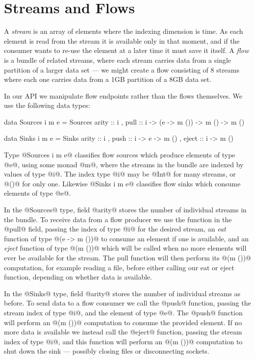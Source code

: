 
\section{Streams and Flows}

A \emph{stream} is an array of elements where the indexing dimension is time. As each element is read from the stream it is available only in that moment, and if the consumer wants to re-use the element at a later time it must save it itself. A \emph{flow} is a bundle of related streams, where each stream carries data from a single partition of a larger data set --- we might create a flow consisting of 8 streams where each one carries data from a 1GB partition of a 8GB data set.

\eject
In our API we manipulate flow endpoints rather than the flows themselves. We use the following data types:

\begin{code}
data Sources i m e 
   = Sources
   { arity :: i
   , pull  :: i -> (e -> m ()) -> m () -> m () }

data Sinks   i m e 
   = Sinks   
   { arity :: i
   , push  :: i -> e -> m ()
   , eject :: i -> m () }
\end{code}

Type @Sources i m e@ classifies flow sources which produce elements of type @e@, using some monad @m@, where the streams in the bundle are indexed by values of type @i@. The index type @i@ may be @Int@ for many streams, or @()@ for only one. Likewise @Sinks i m e@ classifies flow sinks which consume elements of type @e@.

In the @Sources@ type, field @arity@ stores the number of individual streams in the bundle. To receive data from a flow producer we use the function in the @pull@ field, passing the index of type @i@ for the desired stream, an \emph{eat} function of type @(e -> m ())@ to consume an element if one is available, and an \emph{eject} function of type @(m ())@ which will be called when no more elements will ever be available for the stream. The pull function will then perform its @(m ())@ computation, for example reading a file, before either calling our eat or eject function, depending on whether data is available.

In the @Sinks@ type, field @arity@ stores the number of individual streams as before. To send data to a flow consumer we call the @push@ function, passing the stream index of type @i@, and the element of type @e@. The @push@ function will perform an @(m ())@ computation to consume the provided element. If no more data is available we instead call the @eject@ function, passing the stream index of type @i@, and this function will perform an @(m ())@ computation to shut down the sink --- possibly closing files or disconnecting sockets.

